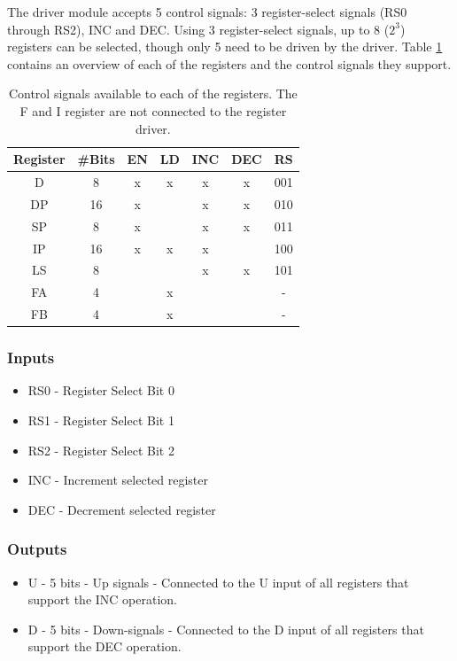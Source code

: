 The driver module accepts 5 control signals: 3 register-select signals (RS0 through RS2), INC and DEC. Using 3 register-select signals, up to 8 ($2^3$) registers can be selected, though only 5 need to be driven by the driver. Table \ref{tab:registers} contains an overview of each of the registers and the control signals they support.

\begin{table}[H]
  \centering
  \begin{tabular}{c|c|c|c|c|c|c}
    Register & \#Bits & EN  & LD  & INC  & DEC & RS \\ \hline 
    D        & 8      & x   & x   & x    & x   & 001 \\
    DP       & 16     & x   &     & x    & x   & 010 \\ 
    SP       & 8      & x   &     & x    & x   & 011 \\ 
    IP       & 16     & x   & x   & x    &     & 100 \\ 
    LS       & 8      &     &     & x    & x   & 101 \\ 
    FA       & 4      &     & x   &      &     & -   \\ 
    FB       & 4      &     & x   &      &     & -   \\
  \end{tabular}
  \caption{Control signals available to each of the registers. The F and I register are not connected to the register driver.}
  \label{tab:registers}
\end{table}

\subsubsection*{Inputs}
\begin{itemize}
  \itemsep0em
\item RS0 - Register Select Bit 0
\item RS1 - Register Select Bit 1
\item RS2 - Register Select Bit 2
\item INC - Increment selected register
\item DEC - Decrement selected register
\end{itemize}

\subsubsection*{Outputs}
\begin{itemize}
\itemsep0em 
\item U - 5 bits - Up signals - Connected to the U input of all registers that support the INC operation.
\item D - 5 bits - Down-signals - Connected to the D input of all registers that support the DEC operation.
\end{itemize}


